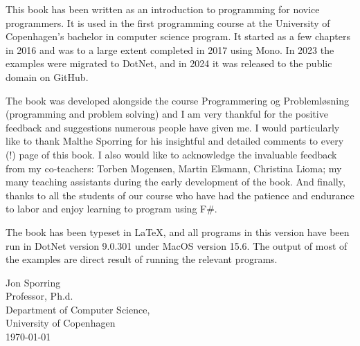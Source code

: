 %
%

\preface

This book has been written as an introduction to programming for novice programmers. It is used in the first programming course at the University of Copenhagen's bachelor in computer science program. It started as a few chapters in 2016 and was to a large extent completed in 2017 using Mono. In 2023 the examples were migrated to DotNet, and in 2024 it was released to the public domain on GitHub.

The book was developed alongside the course Programmering og Problemløsning (programming and problem solving) and I am very thankful for the positive feedback and suggestions numerous people have given me.  I would particularly like to thank Malthe Sporring for his insightful and detailed comments to every (!) page of this book. I also would like to acknowledge the invaluable feedback from my co-teachers: Torben Mogensen, Martin Elsmann, Christina Lioma; my many teaching assistants during the early development of the book. And finally, thanks to all the students of our course who have had the patience and endurance to labor and enjoy learning to program using F\#.

The book has been typeset in \LaTeX, and all programs in this version have been run in DotNet version 9.0.301 under MacOS version 15.6. The output of most of the examples are direct result of running the relevant programs.

%

\vspace*{1cm}
Jon Sporring\\
Professor, Ph.d.\\
Department of Computer Science,\\
University of Copenhagen\\
\today\\
